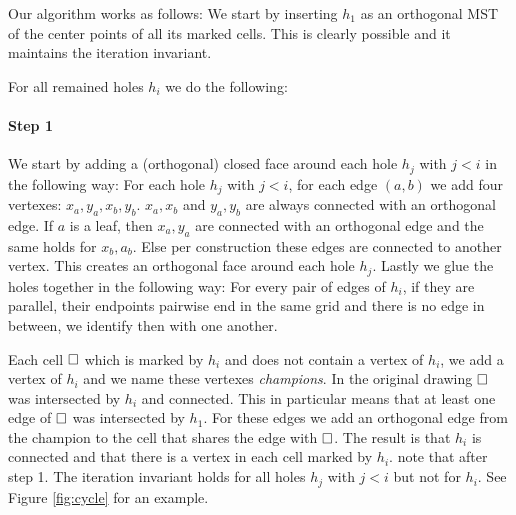 \documentclass[a4paper, UKenglish]{lipics-v2018}
\newcommand{\pix}{\square}
\begin{document}
Our algorithm works as follows: We start by inserting $h_1$ as an orthogonal MST of the center points of all its marked cells. This is clearly possible and it maintains the iteration invariant.



For all remained holes $h_i$ we do the following:

\paragraph*{Step 1}
We start by adding a (orthogonal) closed face around each hole $h_j$ with $j < i$ in the following way:
For each hole $h_j$ with $j < i$, for each edge $(a,b)$ we add four vertexes: $x_a, y_a, x_b, y_b$.  $x_a, x_b$ and $y_a,y_b$ are always connected with an orthogonal edge. If $a$ is a leaf, then $x_a,y_a$ are connected with an orthogonal edge and the same holds for $x_b,a_b$. Else per construction these edges are connected to another vertex. This creates an orthogonal face around each hole $h_j$.
Lastly we glue the holes together in the following way: For every pair of edges of $h_i$, if they are parallel, their endpoints pairwise end in the same grid and there is no edge in between, we identify then with one another. 

Each cell $\hfill\pix$ which is marked by $h_i$ and does not contain a vertex of $h_i$, we add a vertex of $h_i$ and we name these vertexes \emph{champions}. In the original drawing $\hfill\pix$ was intersected by $h_i$ and connected. This in particular means that at least one edge of $\hfill\pix$ was intersected by $h_1$. For these edges we add an orthogonal edge from the champion to the cell that shares the edge with $\hfill\pix$. The result is that $h_i$ is connected and that there is a vertex in each cell marked by $h_i$.
note that after step 1. The iteration invariant holds for all holes $h_j$ with $j < i$ but not for $h_i$. See Figure \ref{fig:cycle} for an example.
\end{document}
